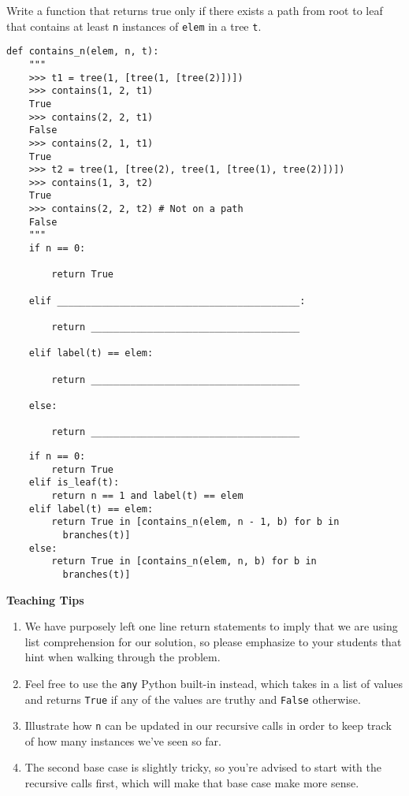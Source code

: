 \begin{blocksection}
\question Write a function that returns true only if there exists a path from root to leaf that contains at least \lstinline$n$ instances of \lstinline$elem$ in a tree \lstinline$t$.

\begin{lstlisting}
def contains_n(elem, n, t):
    """
    >>> t1 = tree(1, [tree(1, [tree(2)])])
    >>> contains(1, 2, t1)
    True
    >>> contains(2, 2, t1)
    False
    >>> contains(2, 1, t1)
    True
    >>> t2 = tree(1, [tree(2), tree(1, [tree(1), tree(2)])])
    >>> contains(1, 3, t2)
    True
    >>> contains(2, 2, t2) # Not on a path
    False
    """
    if n == 0:

        return True

    elif ___________________________________________:

        return _____________________________________

    elif label(t) == elem:

        return _____________________________________

    else:

        return _____________________________________
\end{lstlisting}
\end{blocksection}

\begin{blocksection}
\begin{solution}
\begin{lstlisting}
    if n == 0:
        return True
    elif is_leaf(t):
        return n == 1 and label(t) == elem
    elif label(t) == elem:
        return True in [contains_n(elem, n - 1, b) for b in     
          branches(t)]
    else:
        return True in [contains_n(elem, n, b) for b in 
          branches(t)]
\end{lstlisting}
\end{solution}
\begin{blocksection}
    \begin{guide}
    \textbf{Teaching Tips}
    \begin{enumerate}
            \item We have purposely left one line return statements to imply that we are using list comprehension for our solution, so please emphasize to your students that hint when walking through the problem.
            \item Feel free to use the \texttt{any} Python built-in instead, which takes in a list of values and returns \texttt{True} if any of the values are truthy and \texttt{False} otherwise.
            \item Illustrate how \texttt{n} can be updated in our recursive calls in order to keep track of how many instances we've seen so far.
            \item The second base case is slightly tricky, so you're advised to start with the recursive calls first, which will make that base case make more sense.
    \end{enumerate}
    \end{guide}
\end{blocksection}
\end{blocksection}